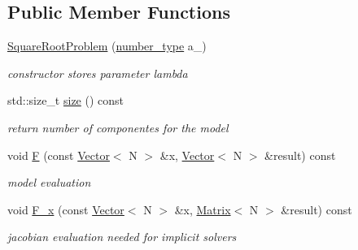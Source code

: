 \subsection*{Public Member Functions}
\begin{DoxyCompactItemize}
\item 
\hypertarget{classhdnum_1_1SquareRootProblem_a33e13342dd64285b8d1f9793c8f68193}{
\hyperlink{classhdnum_1_1SquareRootProblem_a33e13342dd64285b8d1f9793c8f68193}{SquareRootProblem} (\hyperlink{classhdnum_1_1SquareRootProblem_a2aada07411c6a24edd9183c73b79f042}{number\_\-type} a\_\-)}
\label{classhdnum_1_1SquareRootProblem_a33e13342dd64285b8d1f9793c8f68193}

\begin{DoxyCompactList}\small\item\em constructor stores parameter lambda \item\end{DoxyCompactList}\item 
\hypertarget{classhdnum_1_1SquareRootProblem_a57ef59e899224f98c7b338373df82646}{
std::size\_\-t \hyperlink{classhdnum_1_1SquareRootProblem_a57ef59e899224f98c7b338373df82646}{size} () const }
\label{classhdnum_1_1SquareRootProblem_a57ef59e899224f98c7b338373df82646}

\begin{DoxyCompactList}\small\item\em return number of componentes for the model \item\end{DoxyCompactList}\item 
\hypertarget{classhdnum_1_1SquareRootProblem_a6d8f30d61e703044b4cb84ce8ef9c479}{
void \hyperlink{classhdnum_1_1SquareRootProblem_a6d8f30d61e703044b4cb84ce8ef9c479}{F} (const \hyperlink{classhdnum_1_1Vector}{Vector}$<$ N $>$ \&x, \hyperlink{classhdnum_1_1Vector}{Vector}$<$ N $>$ \&result) const }
\label{classhdnum_1_1SquareRootProblem_a6d8f30d61e703044b4cb84ce8ef9c479}

\begin{DoxyCompactList}\small\item\em model evaluation \item\end{DoxyCompactList}\item 
\hypertarget{classhdnum_1_1SquareRootProblem_ab5a5565fde89e4794d5b819ea76b9a1e}{
void \hyperlink{classhdnum_1_1SquareRootProblem_ab5a5565fde89e4794d5b819ea76b9a1e}{F\_\-x} (const \hyperlink{classhdnum_1_1Vector}{Vector}$<$ N $>$ \&x, \hyperlink{classhdnum_1_1Matrix}{Matrix}$<$ N $>$ \&result) const }
\label{classhdnum_1_1SquareRootProblem_ab5a5565fde89e4794d5b819ea76b9a1e}

\begin{DoxyCompactList}\small\item\em jacobian evaluation needed for implicit solvers \item\end{DoxyCompactList}\end{DoxyCompactItemize}


